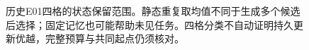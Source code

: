 \begin{figure}[htbp]
\centering

\caption{历史E01四格的状态保留范围。静态重复取均值不同于生成多个候选后选择；固定记忆也可能帮助未见任务。四格分类不自动证明持久更新优越，完整预算与共同起点仍须核对。}
\label{fig:ch03-budget}
\end{figure}
